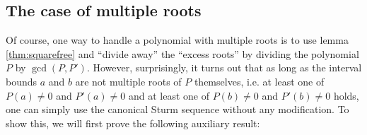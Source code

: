 \documentclass[11pt,a4paper,oneside]{article}
\newcommand{\RR}{\mathbb{R}}
\newcommand{\ie}{i.\,e.\xspace}
\begin{document}


\subsection{The case of multiple roots}

Of course, one way to handle a polynomial with multiple roots is to use lemma \ref{thm:squarefree} and \enquote{divide away} the \enquote{excess roots} by dividing the polynomial $P$ by $\gcd(P,P')$. However, surprisingly, it turns out that as long as the interval bounds $a$ and $b$ are not multiple roots of $P$ themselves, i.e. at least one of $P(a)\neq 0$ and $P'(a)\neq 0$ and at least one of $P(b)\neq 0$ and $P'(b)\neq 0$ holds, one can simply use the canonical Sturm sequence without any modification. To show this, we will first prove the following auxiliary result:
\end{document}
